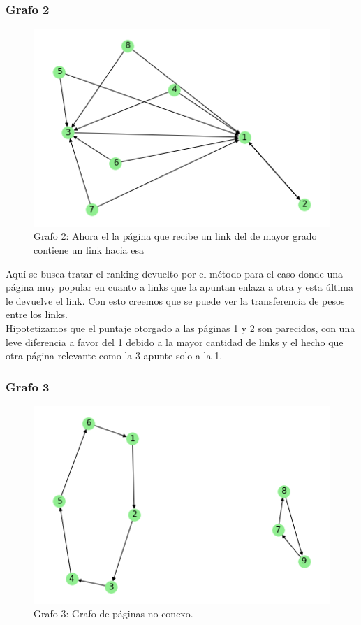 \subsubsection{Grafo 2}

\begin{figure}[H]
    \begin{center}
        \includegraphics{img/prueba_grafo_2.png}
    \end{center}
\caption{Grafo 2: Ahora el la página que recibe un link del de mayor grado contiene un link hacia esa} \label{fig:exp3-grafo2}
\end{figure}

Aquí se busca tratar el ranking devuelto por el método para el caso donde una página muy popular en cuanto a links que la apuntan enlaza a otra y esta última le devuelve el link. Con esto creemos que se puede ver la transferencia de pesos entre los links. \\

Hipotetizamos que el puntaje otorgado a las páginas 1 y 2 son parecidos, con una leve diferencia a favor del 1 debido a la mayor cantidad de links y el hecho que otra página relevante como la 3 apunte solo a la 1. \\

\subsubsection{Grafo 3}

\begin{figure}[H]
   \begin{center}
     \includegraphics{img/prueba_3_no_conexa.png} 
  \end{center}
\caption{Grafo 3: Grafo de páginas no conexo.} \label{fig:exp3-noconexo}
\end{figure}


